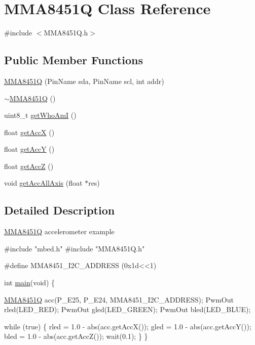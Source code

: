\hypertarget{classMMA8451Q}{}\section{M\+M\+A8451Q Class Reference}
\label{classMMA8451Q}


{\ttfamily \#include $<$M\+M\+A8451\+Q.\+h$>$}

\subsection*{Public Member Functions}
\begin{DoxyCompactItemize}
\item 
\hyperlink{classMMA8451Q_a59430cfeb113615458a2b73fdc7391e9}{M\+M\+A8451Q} (Pin\+Name sda, Pin\+Name scl, int addr)
\item 
\hyperlink{classMMA8451Q_add2fade85a24b3c6ae7cc489a04ba009}{$\sim$\+M\+M\+A8451Q} ()
\item 
uint8\+\_\+t \hyperlink{classMMA8451Q_adbf87f413cfa95e88d49990b2a4af6d4}{get\+Who\+AmI} ()
\item 
float \hyperlink{classMMA8451Q_a9226a2f00edef47be520ecca28d6a425}{get\+AccX} ()
\item 
float \hyperlink{classMMA8451Q_a365e88d07f16faa9da4183f34055b4a5}{get\+AccY} ()
\item 
float \hyperlink{classMMA8451Q_afb63783e2e4d3af92229dd0311905132}{get\+AccZ} ()
\item 
void \hyperlink{classMMA8451Q_a6d7892d095e4f697b6f50ebc3d4b4cfc}{get\+Acc\+All\+Axis} (float $\ast$res)
\end{DoxyCompactItemize}


\subsection{Detailed Description}
\hyperlink{classMMA8451Q}{M\+M\+A8451Q} accelerometer example


\begin{DoxyCode}
\textcolor{preprocessor}{#include "mbed.h"}
\textcolor{preprocessor}{#include "MMA8451Q.h"}

\textcolor{preprocessor}{#define MMA8451\_I2C\_ADDRESS (0x1d<<1)}

\textcolor{keywordtype}{int} \hyperlink{module2_8cpp_a840291bc02cba5474a4cb46a9b9566fe}{main}(\textcolor{keywordtype}{void}) \{

\hyperlink{classMMA8451Q}{MMA8451Q} acc(P\_E25, P\_E24, MMA8451\_I2C\_ADDRESS);
PwmOut rled(LED\_RED);
PwmOut gled(LED\_GREEN);
PwmOut bled(LED\_BLUE);

    \textcolor{keywordflow}{while} (\textcolor{keyword}{true}) \{       
        rled = 1.0 - abs(acc.getAccX());
        gled = 1.0 - abs(acc.getAccY());
        bled = 1.0 - abs(acc.getAccZ());
        wait(0.1);
    \}
\}
\end{DoxyCode}
 

